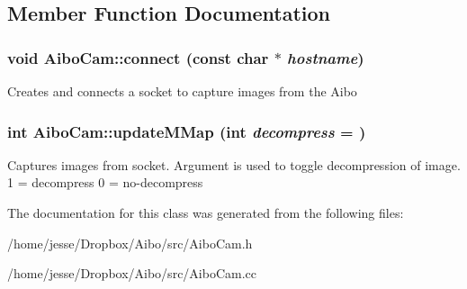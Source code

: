 \subsection{Member Function Documentation}
\hypertarget{classAiboCam_aa450f46c7d0bfc09ec6f6b16cb42fdc6}{
\subsubsection[{connect}]{\setlength{\rightskip}{0pt plus 5cm}void AiboCam::connect (const char $\ast$ {\em hostname})}}
\label{classAiboCam_aa450f46c7d0bfc09ec6f6b16cb42fdc6}
Creates and connects a socket to capture images from the Aibo \hypertarget{classAiboCam_a72162af9d25b9b24d6449d41b234f8b2}{
\subsubsection[{updateMMap}]{\setlength{\rightskip}{0pt plus 5cm}int AiboCam::updateMMap (int {\em decompress} = {})}}
\label{classAiboCam_a72162af9d25b9b24d6449d41b234f8b2}
Captures images from socket. Argument is used to toggle decompression of image. 1 = decompress 0 = no-\/decompress 

The documentation for this class was generated from the following files:\begin{DoxyCompactItemize}
\item 
/home/jesse/Dropbox/Aibo/src/AiboCam.h\item 
/home/jesse/Dropbox/Aibo/src/AiboCam.cc\end{DoxyCompactItemize}
